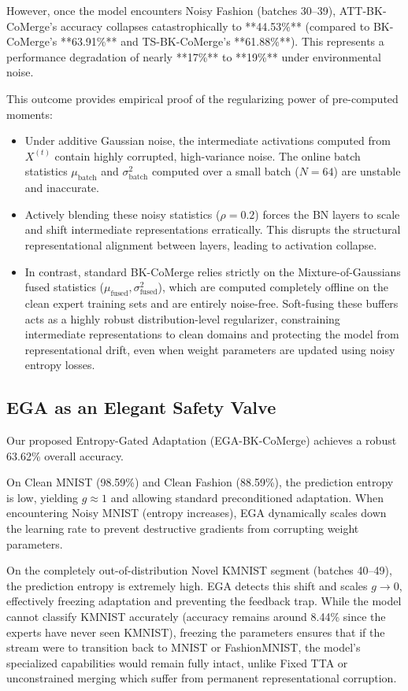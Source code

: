 \documentclass{article}
\theoremstyle{plain}
\theoremstyle{definition}
\theoremstyle{remark}
\begin{document}
However, once the model encounters Noisy Fashion (batches 30--39), ATT-BK-CoMerge's accuracy collapses catastrophically to **44.53\%** (compared to BK-CoMerge's **63.91\%** and TS-BK-CoMerge's **61.88\%**). This represents a performance degradation of nearly **17\%** to **19\%** under environmental noise.

This outcome provides empirical proof of the regularizing power of pre-computed moments:
\begin{itemize}
    \item Under additive Gaussian noise, the intermediate activations computed from $X^{(t)}$ contain highly corrupted, high-variance noise. The online batch statistics $\mu_{\text{batch}}$ and $\sigma^2_{\text{batch}}$ computed over a small batch ($N=64$) are unstable and inaccurate. 
    \item Actively blending these noisy statistics ($\rho = 0.2$) forces the BN layers to scale and shift intermediate representations erratically. This disrupts the structural representational alignment between layers, leading to activation collapse.
    \item In contrast, standard BK-CoMerge relies strictly on the Mixture-of-Gaussians fused statistics ($\mu_{\text{fused}}, \sigma^2_{\text{fused}}$), which are computed completely offline on the clean expert training sets and are entirely noise-free. Soft-fusing these buffers acts as a highly robust distribution-level regularizer, constraining intermediate representations to clean domains and protecting the model from representational drift, even when weight parameters are updated using noisy entropy losses.
\end{itemize}

\subsection{EGA as an Elegant Safety Valve}
Our proposed Entropy-Gated Adaptation (EGA-BK-CoMerge) achieves a robust 63.62\% overall accuracy. 

On Clean MNIST (98.59\%) and Clean Fashion (88.59\%), the prediction entropy is low, yielding $g \approx 1$ and allowing standard preconditioned adaptation. When encountering Noisy MNIST (entropy increases), EGA dynamically scales down the learning rate to prevent destructive gradients from corrupting weight parameters. 

On the completely out-of-distribution Novel KMNIST segment (batches 40--49), the prediction entropy is extremely high. EGA detects this shift and scales $g \to 0$, effectively freezing adaptation and preventing the feedback trap. While the model cannot classify KMNIST accurately (accuracy remains around 8.44\% since the experts have never seen KMNIST), freezing the parameters ensures that if the stream were to transition back to MNIST or FashionMNIST, the model's specialized capabilities would remain fully intact, unlike Fixed TTA or unconstrained merging which suffer from permanent representational corruption.
\end{document}

